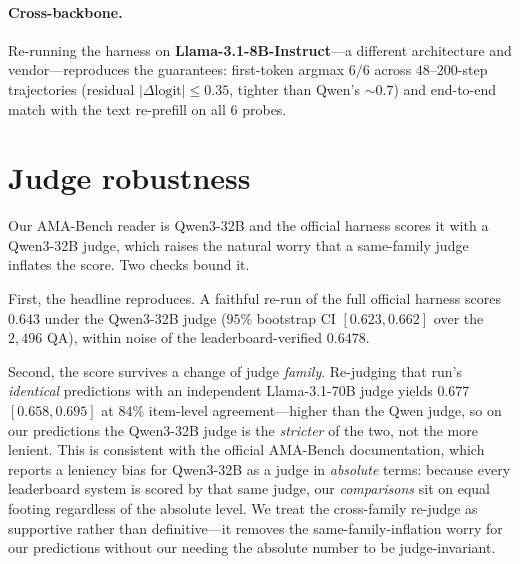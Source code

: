 \documentclass{article} %
\begin{document}
\paragraph{Cross-backbone.} Re-running the harness on
\textbf{Llama-3.1-8B-Instruct}---a different architecture and vendor---reproduces
the guarantees: first-token argmax $6/6$ across $48$--$200$-step trajectories
(residual $|\Delta\text{logit}|\le0.35$, tighter than Qwen's $\sim\!0.7$) and
end-to-end match with the text re-prefill on all $6$ probes.


\section{Judge robustness}
\label{app:judge}

Our AMA-Bench reader is Qwen3-32B and the official harness scores it with a
Qwen3-32B judge, which raises the natural worry that a same-family judge inflates
the score. Two checks bound it.

First, the headline reproduces. A faithful re-run of the full official harness
scores $0.643$ under the Qwen3-32B judge ($95\%$ bootstrap CI $[0.623,0.662]$ over
the $2{,}496$ QA), within noise of the leaderboard-verified $0.6478$.

Second, the score survives a change of judge \emph{family}. Re-judging that run's
\emph{identical} predictions with an independent Llama-3.1-70B judge yields
$0.677$ $[0.658,0.695]$ at $84\%$ item-level agreement---higher than the Qwen
judge, so on our predictions the Qwen3-32B judge is the \emph{stricter} of the
two, not the more lenient. This is consistent with the official AMA-Bench
documentation, which reports a leniency bias for Qwen3-32B as a judge in
\emph{absolute} terms: because every leaderboard system is scored by that same
judge, our \emph{comparisons} sit on equal footing regardless of the absolute
level. We treat the cross-family re-judge as supportive rather than
definitive---it removes the same-family-inflation worry for our predictions
without our needing the absolute number to be judge-invariant.
\end{document}
